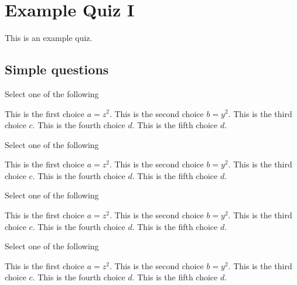 \chapter{Example Quiz I}
\label{ch:quiz-i}

\begin{preamble}
This is an example quiz.
\end{preamble}


\section{Simple questions}
\label{XXsec:sets::math}


\begin{problem}[Choices I]
Select one of the following
\begin{choices}
\choice This is the first choice $a = z^2$.
\choice This is the second choice $b = y^2$.
\correctchoice This is the third choice $c$.
\correctchoice This is the fourth choice $d$.
\choice This is the fifth choice $d$.
\end{choices}
\end{problem}

\begin{problem}[Choices I.2]
Select one of the following
\begin{checks}
\choice This is the first choice $a = z^2$.
\choice This is the second choice $b = y^2$.
\correctchoice This is the third choice $c$.
\correctchoice This is the fourth choice $d$.
\choice This is the fifth choice $d$.
\end{checks}
\end{problem}


\begin{problem}[Choices II]
Select one of the following
\begin{choices}[20]
\choice This is the first choice $a = z^2$.
\choice This is the second choice $b = y^2$.
\correctchoice This is the third choice $c$.
\correctchoice This is the fourth choice $d$.
\choice This is the fifth choice $d$.
\end{choices}
\end{problem}

\begin{problem}
Select one of the following
\begin{choices}[30]
\choice This is the first choice $a = z^2$.
\choice This is the second choice $b = y^2$.
\correctchoice This is the third choice $c$.
\correctchoice This is the fourth choice $d$.
\choice This is the fifth choice $d$.
\end{choices}
\end{problem}



